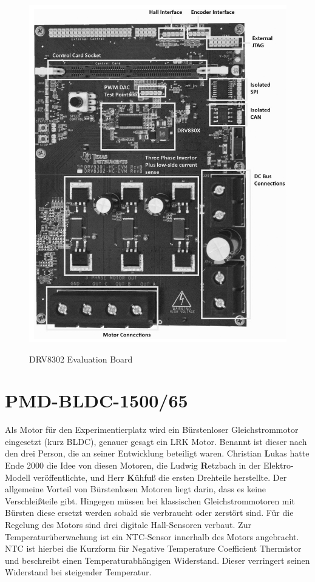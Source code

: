 \begin{figure}[htbp]
	\centering
	\includegraphics[width=\textwidth]{hardware/graphics/TI_Eval_Board}
	\caption{DRV8302 Evaluation Board}
	\quelle \cite{Instruments2014}
	\label{fig:DRV8302Board}
\end{figure}


\section{PMD-BLDC-1500/65}
Als Motor für den Experimentierplatz wird ein Bürstenloser Gleichstrommotor eingesetzt (kurz BLDC), genauer gesagt ein LRK Motor. 
Benannt ist dieser nach den drei Person, die an seiner Entwicklung beteiligt waren.
Christian \textbf{L}ukas hatte Ende 2000 die Idee von diesen Motoren, die Ludwig \textbf{R}etzbach in der Elektro-Modell veröffentlichte, und Herr \textbf{K}ühfuß die ersten Drehteile herstellte.
Der allgemeine Vorteil von Bürstenlosen Motoren liegt darin, dass es keine Verschleißteile gibt.
Hingegen müssen bei klassischen Gleichstrommotoren mit Bürsten diese ersetzt werden sobald sie verbraucht oder zerstört sind.
Für die Regelung des Motors sind drei digitale Hall-Sensoren verbaut.
Zur Temperaturüberwachung ist ein NTC-Sensor innerhalb des Motors angebracht. 
NTC ist hierbei die Kurzform für Negative Temperature Coefficient Thermistor und beschreibt einen Temperaturabhängigen Widerstand.
Dieser verringert seinen Widerstand bei steigender Temperatur.
